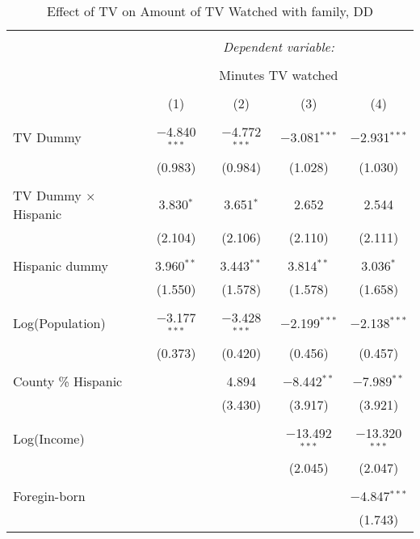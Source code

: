 
\begin{table}[!htbp] \centering 
  \caption{Effect of TV on Amount of TV Watched with family, DD} 
  \label{} 
\begin{tabular}{@{\extracolsep{-5pt}}lcccc} 
\\[-1.8ex]\hline 
\hline \\[-1.8ex] 
 & \multicolumn{4}{c}{\textit{Dependent variable:}} \\ 
\cline{2-5} 
\\[-1.8ex] & \multicolumn{4}{c}{Minutes TV watched} \\ 
\\[-1.8ex] & (1) & (2) & (3) & (4)\\ 
\hline \\[-1.8ex] 
 TV Dummy & $-$4.840$^{***}$ & $-$4.772$^{***}$ & $-$3.081$^{***}$ & $-$2.931$^{***}$ \\ 
  & (0.983) & (0.984) & (1.028) & (1.030) \\ 
  & & & & \\ 
 TV Dummy $\times$ Hispanic  & 3.830$^{*}$ & 3.651$^{*}$ & 2.652 & 2.544 \\ 
  & (2.104) & (2.106) & (2.110) & (2.111) \\ 
  & & & & \\ 
 Hispanic dummy & 3.960$^{**}$ & 3.443$^{**}$ & 3.814$^{**}$ & 3.036$^{*}$ \\ 
  & (1.550) & (1.578) & (1.578) & (1.658) \\ 
  & & & & \\ 
 Log(Population) & $-$3.177$^{***}$ & $-$3.428$^{***}$ & $-$2.199$^{***}$ & $-$2.138$^{***}$ \\ 
  & (0.373) & (0.420) & (0.456) & (0.457) \\ 
  & & & & \\ 
 County \% Hispanic &  & 4.894 & $-$8.442$^{**}$ & $-$7.989$^{**}$ \\ 
  &  & (3.430) & (3.917) & (3.921) \\ 
  & & & & \\ 
 Log(Income) &  &  & $-$13.492$^{***}$ & $-$13.320$^{***}$ \\ 
  &  &  & (2.045) & (2.047) \\ 
  & & & & \\ 
 Foregin-born &  &  &  & $-$4.847$^{***}$ \\ 
  &  &  &  & (1.743) \\ 

\end{tabular}
\end{table}
